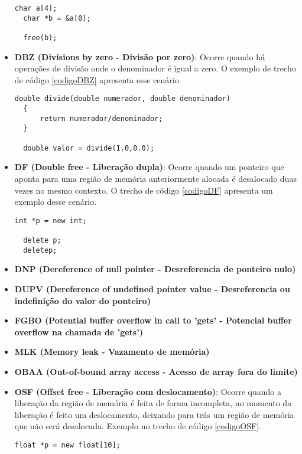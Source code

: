\begin{itemize}
    \begin{lstlisting}[caption={Código exemplo BF}, label=codigoBF]
  char a[4];
  char *b = &a[0];

  free(b);
    \end{lstlisting}
  \item \textbf{DBZ (Divisions by zero - Divisão por zero)}: Ocorre quando há operações de divisão onde o denominador é igual
    a zero. O exemplo de trecho de código \ref{codigoDBZ} apresenta esse cenário.

    \begin{lstlisting}[caption={Código exemplo DBZ}, label=codigoDBZ]
  double divide(double numerador, double denominador)
  {
      return numerador/denominador;
  }

  double valor = divide(1.0,0.0);
    \end{lstlisting}
  \item \textbf{DF (Double free - Liberação dupla)}: Ocorre quando um ponteiro que aponta para uma região de memória 
    anteriormente alocada é desalocado duas vezes no mesmo contexto. O trecho de código \ref{codigoDF} apresenta um exemplo
    desse cenário.

    \begin{lstlisting}[caption={Código exemplo DF}, label=codigoDF]
  int *p = new int;

  delete p;
  deletep;
    \end{lstlisting}
  \item \textbf{DNP (Dereference of null pointer - Desreferencia de ponteiro nulo)}
  \item \textbf{DUPV (Dereference of undefined pointer value - Desreferencia ou indefinição do valor do ponteiro)}
  \item \textbf{FGBO (Potential buffer overflow in call to 'gets' - Potencial buffer overflow na chamada de 'gets')}
  \item \textbf{MLK (Memory leak - Vazamento de memória)}
  \item \textbf{OBAA (Out-of-bound array access - Acesso de array fora do limite)}
  \item \textbf{OSF (Offset free - Liberação com deslocamento)}: Ocorre quando a liberação da região de memória é feita de 
    forma incompleta, no momento da liberação é feito um deslocamento, deixando para trás um região de memória que não será
    desalocada. Exemplo no trecho de código \ref{codigoOSF}.

    \begin{lstlisting}[caption={Código exemplo OSF}, label=codigoOSF]
  float *p = new float[10];


\end{lstlisting}
\end{itemize}
